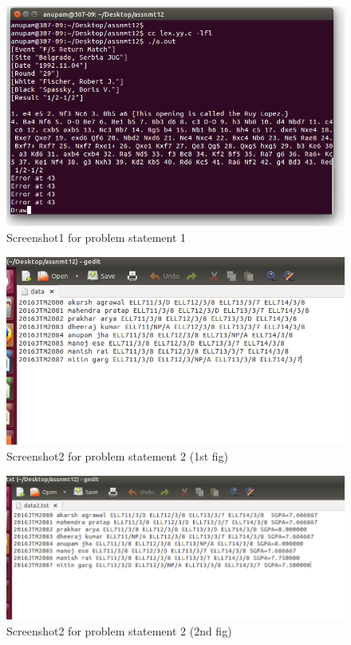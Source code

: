 \documentclass[12pt]{article}
\begin{document}
\begin{figure}[h]

\includegraphics[scale=0.6]{ps1.png}
\caption{Screenshot1 for problem statement 1}
\end{figure}


\newpage

\begin{figure}[h]
\includegraphics[scale=0.65]{ps21.png}
\caption{Screenshot2 for problem statement 2 (1st fig)}
\end{figure}

\newpage

\begin{figure}[h]
\includegraphics[scale=0.65]{ps22.png}
\caption{Screenshot2 for problem statement 2 (2nd fig)}
\end{figure}
\end{document}
